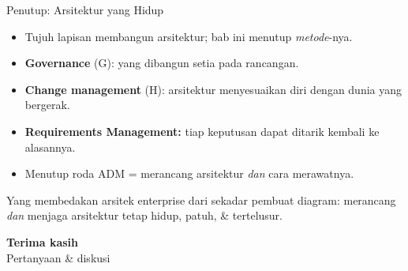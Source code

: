 \documentclass[aspectratio=169, table]{beamer}
\newcommand{\takeaway}[1]{%
  \vspace{4pt}
  {\footnotesize #1}
}
\begin{document}
\begin{frame}{Penutup: Arsitektur yang Hidup}
  \vspace{6pt}
  \footnotesize
  \begin{itemize}\setlength{\itemsep}{2.0pt}
    \item Tujuh lapisan membangun arsitektur; bab ini menutup \emph{metode}-nya.
    \item \textbf{Governance} (G): yang dibangun setia pada rancangan.
    \item \textbf{Change management} (H): arsitektur menyesuaikan diri dengan
          dunia yang bergerak.
    \item \textbf{Requirements Management:} tiap keputusan dapat ditarik kembali ke
          alasannya.
    \item Menutup roda ADM = merancang arsitektur \emph{dan} cara merawatnya.
  \end{itemize}
  \takeaway{Yang membedakan arsitek enterprise dari sekadar pembuat diagram:
  merancang \emph{dan} menjaga arsitektur tetap hidup, patuh, \& tertelusur.}
\end{frame}

\begin{frame}{\hfill}
  \centering
  \Huge{\textbf{Terima kasih}}\\[8pt]
  \normalsize Pertanyaan \& diskusi
\end{frame}
\end{document}
